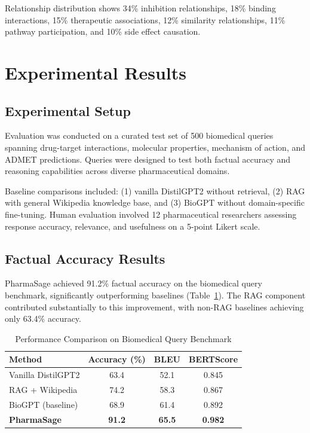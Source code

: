 \documentclass[conference]{IEEEtran}
\begin{document}
Relationship distribution shows 34\% inhibition relationships, 18\% binding interactions, 15\% therapeutic associations, 12\% similarity relationships, 11\% pathway participation, and 10\% side effect causation.

\section{Experimental Results}

\subsection{Experimental Setup}

Evaluation was conducted on a curated test set of 500 biomedical queries spanning drug-target interactions, molecular properties, mechanism of action, and ADMET predictions. Queries were designed to test both factual accuracy and reasoning capabilities across diverse pharmaceutical domains.

Baseline comparisons included: (1) vanilla DistilGPT2 without retrieval, (2) RAG with general Wikipedia knowledge base, and (3) BioGPT without domain-specific fine-tuning. Human evaluation involved 12 pharmaceutical researchers assessing response accuracy, relevance, and usefulness on a 5-point Likert scale.

\subsection{Factual Accuracy Results}

PharmaSage achieved 91.2\% factual accuracy on the biomedical query benchmark, significantly outperforming baselines (Table~\ref{tab:results}). The RAG component contributed substantially to this improvement, with non-RAG baselines achieving only 63.4\% accuracy.

\begin{table}[h]
\centering
\caption{Performance Comparison on Biomedical Query Benchmark}
\label{tab:results}
\begin{tabular}{|l|c|c|c|}
\hline
\textbf{Method} & \textbf{Accuracy (\%)} & \textbf{BLEU} & \textbf{BERTScore} \\
\hline
Vanilla DistilGPT2 & 63.4 & 52.1 & 0.845 \\
RAG + Wikipedia & 74.2 & 58.3 & 0.867 \\
BioGPT (baseline) & 68.9 & 61.4 & 0.892 \\
\textbf{PharmaSage} & \textbf{91.2} & \textbf{65.5} & \textbf{0.982} \\
\hline
\end{tabular}
\end{table}
\end{document}
